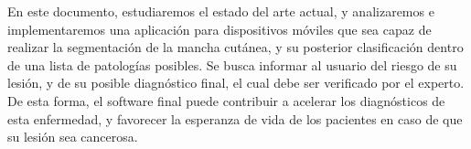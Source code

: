 En este documento, estudiaremos el estado del arte actual, y analizaremos e implementaremos una aplicación para dispositivos móviles que sea capaz de realizar la segmentación de la mancha cutánea, y su posterior clasificación dentro de una lista de patologías posibles. Se busca informar al usuario del riesgo de su lesión, y de su posible diagnóstico final, el cual debe ser verificado por el experto. De esta forma, el software final puede contribuir a acelerar los diagnósticos de esta enfermedad,  y favorecer la esperanza de vida de los pacientes en caso de que su lesión sea cancerosa.